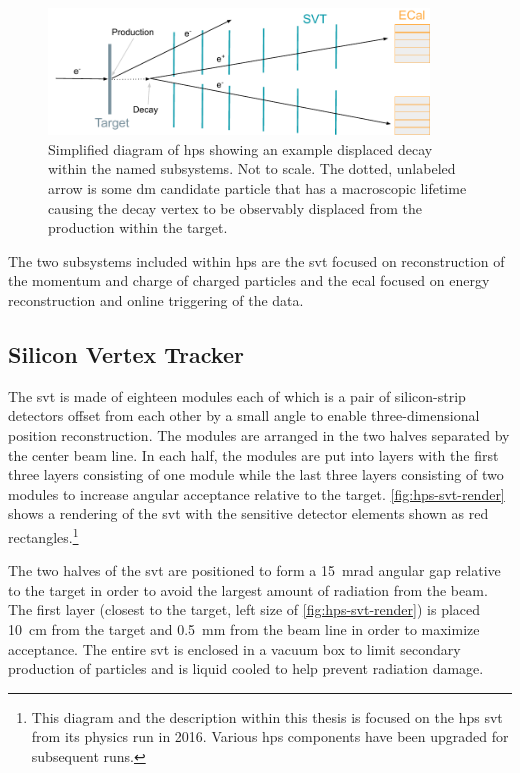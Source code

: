 \begin{figure}
  \centering
  \includegraphics[width=0.9\textwidth]{figures/hps/experiment/hps-diagram.pdf}
  \caption{
    Simplified diagram of \ac{hps} showing an example displaced decay within the named subsystems.
    Not to scale.
    The dotted, unlabeled arrow is some \ac{dm} candidate particle that has a macroscopic lifetime causing
    the decay vertex to be observably displaced from the production within the target.
  }
  \label{fig:hps-diagram}
\end{figure}

The two subsystems included within \ac{hps} are the \ac{svt} focused on reconstruction of the
momentum and charge of charged particles and the \ac{ecal} focused on energy reconstruction and
online triggering of the data.

\subsection{Silicon Vertex Tracker}
The \ac{svt} is made of eighteen modules each of which is a pair of silicon-strip detectors offset
from each other by a small angle to enable three-dimensional position reconstruction. The modules
are arranged in the two halves separated by the center beam line. In each half, the modules are put
into layers with the first three layers consisting of one module while the last three layers
consisting of two modules to increase angular acceptance relative to the target.
\cref{fig:hps-svt-render} shows a rendering of the \ac{svt} with the sensitive detector elements
shown as red rectangles.\footnote{ This diagram and the description within this thesis is focused
  on the \ac{hps} \ac{svt} from its physics run in 2016. Various \ac{hps} components have been
  upgraded for subsequent runs. }

The two halves of the \ac{svt} are positioned to form a \qty{15}{\milli\radian} angular gap
relative to the target in order to avoid the largest amount of radiation from the beam. The first
layer (closest to the target, left size of \cref{fig:hps-svt-render}) is placed \qty{10}{\cm} from
the target and \qty{0.5}{\mm} from the beam line in order to maximize acceptance. The entire
\ac{svt} is enclosed in a vacuum box to limit secondary production of particles and is liquid
cooled to help prevent radiation damage.

